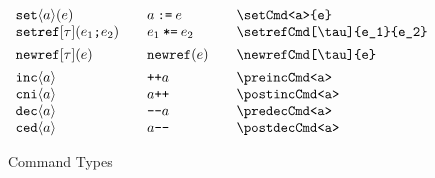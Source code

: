 \documentclass[11pt]{article}
\begin{document}
\begin{figure}
\begin{small}
\begin{displaymath}
\begin{array}{l@{\qquad}l@{\qquad}l@{\qquad}l}
        \setCmd<a>{e}              & \setCmd*<a>{e}              & \verb|\setCmd<a>{e}|              \\
        \setrefCmd[\tau]{e_1}{e_2} & \setrefCmd*[\tau]{e_1}{e_2} & \verb|\setrefCmd[\tau]{e_1}{e_2}|  \\[1ex]
        \newrefCmd[\tau]{e}        & \newrefCmd*{e}              & \verb|\newrefCmd[\tau]{e}| \\[1ex]
        \preincCmd<a>              & \preincCmd*<a>              & \verb|\preincCmd<a>| \\
        \postincCmd<a>             & \postincCmd*<a>             & \verb|\postincCmd<a>| \\
        \predecCmd<a>              & \predecCmd*<a>              & \verb|\predecCmd<a>| \\
        \postdecCmd<a>             & \postdecCmd*<a>             & \verb|\postdecCmd<a>|
      \end{array}
    \end{displaymath}
  \end{small}

  \caption{Command Types}
  \label{fig:cmd}
\end{figure}
\end{document}
